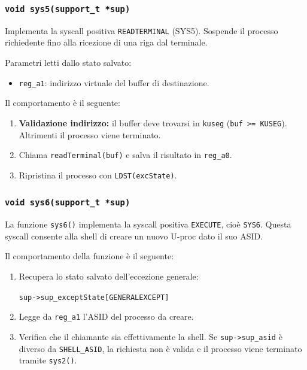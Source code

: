 \documentclass[a4paper,12pt]{article}
\begin{document}
\begin{enumerate}
 
\subsubsection{\texttt{void sys5(support\_t *sup)}}
 
Implementa la syscall positiva \texttt{READTERMINAL} (SYS5). Sospende il
processo richiedente fino alla ricezione di una riga dal terminale.
 
\medskip
Parametri letti dallo stato salvato:
 
\begin{itemize}
    \item \texttt{reg\_a1}: indirizzo virtuale del buffer di destinazione.
\end{itemize}
 
Il comportamento è il seguente:
 
\begin{enumerate}
    \item \textbf{Validazione indirizzo:} il buffer deve trovarsi in \texttt{kuseg}
          (\texttt{buf >= KUSEG}). Altrimenti il processo viene terminato.
 
    \item Chiama \texttt{readTerminal(buf)} e salva il risultato in \texttt{reg\_a0}.
 
    \item Ripristina il processo con \texttt{LDST(excState)}.
\end{enumerate}
\vspace{0.3cm}
\subsubsection{\texttt{void sys6(support\_t *sup)}}

La funzione \texttt{sys6()} implementa la syscall positiva \texttt{EXECUTE}, cioè \texttt{SYS6}. Questa syscall consente alla shell di creare un nuovo U-proc dato il suo ASID.

Il comportamento della funzione è il seguente:

\begin{enumerate}
    \item Recupera lo stato salvato dell'eccezione generale:

        \texttt{sup->sup\_exceptState[GENERALEXCEPT]}

    \item Legge da \texttt{reg\_a1} l'ASID del processo da creare.

    \item Verifica che il chiamante sia effettivamente la shell. Se \texttt{sup->sup\_asid} è diverso da \texttt{SHELL\_ASID}, la richiesta non è valida e il processo viene terminato tramite \texttt{sys2()}.


\end{enumerate}
\end{enumerate}
\end{document}

